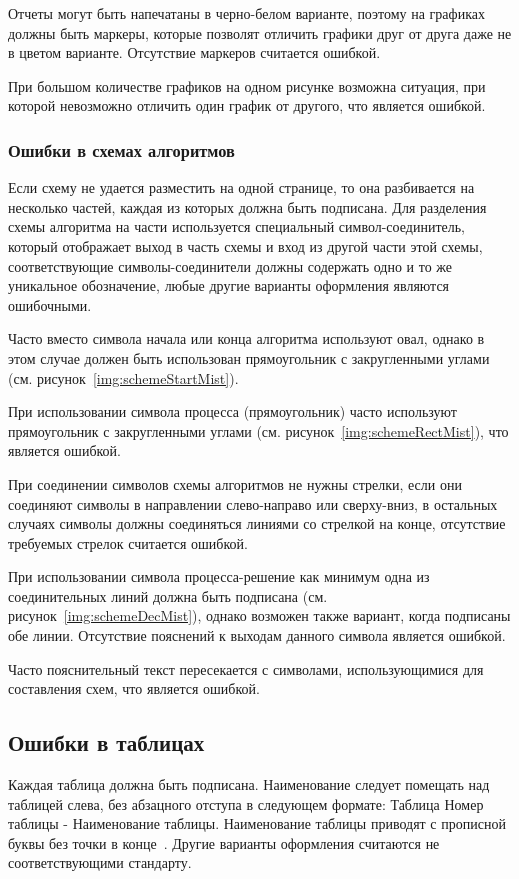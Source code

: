 \begin{appendices}
	Отчеты могут быть напечатаны в черно-белом варианте, поэтому на графиках должны быть маркеры, которые позволят отличить графики друг от друга даже не в цветом варианте. Отсутствие маркеров считается ошибкой.
	
	При большом количестве графиков на одном рисунке возможна ситуация, при которой невозможно отличить один график от другого, что является ошибкой.
	
	\subsubsection{Ошибки в схемах алгоритмов}
	Если схему не удается разместить на одной странице, то она разбивается на несколько частей, каждая из которых должна быть подписана. Для разделения схемы алгоритма на части используется специальный символ-соединитель, который отображает выход в часть схемы и вход из другой части этой схемы, соответствующие символы-соединители должны содержать одно и то же уникальное обозначение, любые другие варианты оформления являются ошибочными.
	
	Часто вместо символа начала или конца алгоритма используют овал, однако в этом случае должен быть использован прямоугольник с закругленными углами (см. рисунок~\ref{img:schemeStartMist}).
	
	При использовании символа процесса (прямоугольник) часто используют прямоугольник с закругленными углами (см. рисунок~\ref{img:schemeRectMist}), что является ошибкой.
	
	При соединении символов схемы алгоритмов не нужны стрелки, если они соединяют символы в направлении слево-направо или сверху-вниз, в остальных случаях символы должны соединяться линиями со стрелкой на конце, отсутствие требуемых стрелок считается ошибкой.
	
	При использовании символа процесса-решение как минимум одна из соединительных линий должна быть подписана (см. рисунок~\ref{img:schemeDecMist}), однако возможен также вариант, когда подписаны обе линии. Отсутствие пояснений к выходам данного символа является ошибкой.
	
	Часто пояснительный текст пересекается с символами, использующимися для составления схем, что является ошибкой.
	
	\subsection{Ошибки в таблицах}
	Каждая таблица должна быть подписана. Наименование следует помещать над таблицей слева, без абзацного отступа в следующем формате: Таблица Номер таблицы - Наименование таблицы. Наименование таблицы приводят с прописной буквы без точки в конце~\cite{GOST732}. Другие варианты оформления считаются не соответствующими стандарту.
	

\end{appendices}
